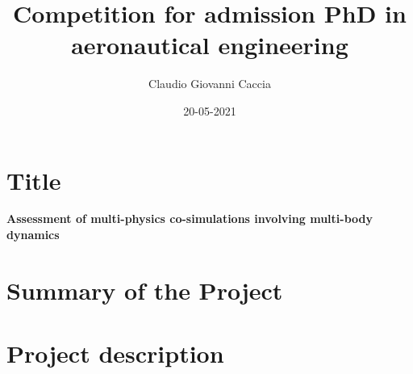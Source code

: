 \documentclass[a4paper]{article}
\title{Competition for admission PhD in \\ aeronautical engineering}
\author{Claudio Giovanni Caccia}
\date{20-05-2021}
\begin{document}
\maketitle

\section*{Title}

\textbf{Assessment of multi-physics co-simulations involving multi-body dynamics}

\section*{Summary of the Project}






\section*{Project description}









\newpage








%



\printbibliography
\end{document}
